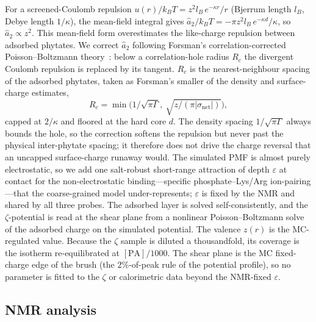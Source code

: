 \documentclass[11pt]{article}
\begin{document}
For a screened-Coulomb repulsion $u(r)/k_BT = z^2 l_B\,e^{-\kappa r}/r$ (Bjerrum
length $l_B$, Debye length $1/\kappa$), the mean-field integral gives
$\hat a_2/k_BT = -\pi z^2 l_B\,e^{-\kappa d}/\kappa$, so $\hat a_2\propto z^2$.  This
mean-field form overestimates the like-charge repulsion between adsorbed phytates.
We correct $\hat a_2$ following Forsman's correlation-corrected Poisson--Boltzmann
theory~\cite{Forsman2004}: below a correlation-hole radius $R_c$ the divergent
Coulomb repulsion is replaced by its tangent.  $R_c$ is the nearest-neighbour
spacing of the adsorbed phytates, taken as Forsman's smaller of the density and
surface-charge estimates,
\begin{equation}\label{eq:Rc}
R_c = \min\!\Big(1/\sqrt{\pi\Gamma},\ \sqrt{z/(\pi|\sigma_\text{net}|)}\Big),
\end{equation}
capped at $2/\kappa$ and floored at the hard core $d$.  The density spacing
$1/\sqrt{\pi\Gamma}$ always bounds the hole, so the correction softens the repulsion
but never past the physical inter-phytate spacing; it therefore does not drive the
charge reversal that an uncapped surface-charge runaway would.  The simulated PMF is
almost purely electrostatic, so we add one salt-robust short-range attraction of
depth $\varepsilon$ at contact for the non-electrostatic binding---specific
phosphate--Lys/Arg ion-pairing---that the coarse-grained model under-represents;
$\varepsilon$ is fixed by the NMR and shared by all three probes.  The adsorbed
layer is solved self-consistently, and the $\zeta$-potential is read at the shear
plane from a nonlinear Poisson--Boltzmann solve of the adsorbed charge on the
simulated potential.  The valence $z(r)$ is the MC-regulated value.  Because the
$\zeta$ sample is diluted a thousandfold, its coverage is the isotherm
re-equilibrated at $[\text{PA}]/1000$.  The shear plane is the MC fixed-charge edge
of the brush (the $2\%$-of-peak rule of the potential profile), so no parameter is
fitted to the $\zeta$ or calorimetric data beyond the NMR-fixed $\varepsilon$.

\subsection{NMR analysis}
\end{document}
